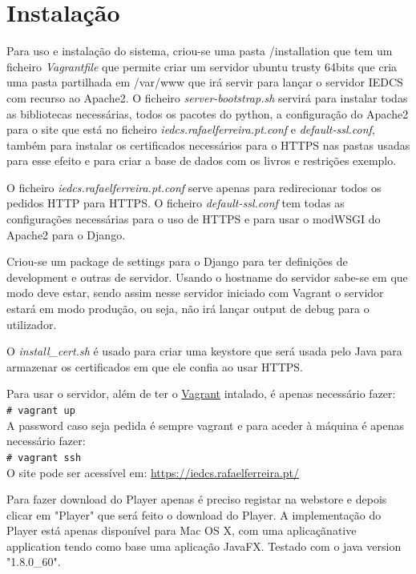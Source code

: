 \documentclass[pdftex,12pt,a4paper]{report}
\newcommand{\shellcmd}[1]{\\\indent\indent\texttt{\footnotesize\# #1}\\}
\begin{document}
\section{Instalação}

Para uso e instalação do sistema, criou-se uma pasta /installation que tem um ficheiro \textit{Vagrantfile} que permite criar um servidor ubuntu trusty 64bits que cria uma pasta partilhada em /var/www que irá servir para lançar o servidor IEDCS com recurso ao Apache2. O ficheiro \textit{server-bootstrap.sh} servirá para instalar todas as bibliotecas necessárias, todos os pacotes do python, a configuração do Apache2 para o site que está no ficheiro \textit{iedcs.rafaelferreira.pt.conf} e \textit{default-ssl.conf}, também para instalar os certificados necessários para o HTTPS nas pastas usadas para esse efeito e para criar a base de dados com os livros e restrições exemplo.
	
O ficheiro \textit{iedcs.rafaelferreira.pt.conf} serve apenas para redirecionar todos os pedidos HTTP para HTTPS. O ficheiro \textit{default-ssl.conf} tem todas as configurações necessárias para o uso de HTTPS e para usar o modWSGI do Apache2 para o Django.

Criou-se um package de settings para o Django para ter definições de development e outras de servidor. Usando o hostname do servidor sabe-se em que modo deve estar, sendo assim nesse servidor iniciado com Vagrant o servidor estará em modo produção, ou seja, não irá lançar output de debug para o utilizador.

O \textit{install{\_}cert.sh} é usado para criar uma keystore que será usada pelo Java para armazenar os certificados em que ele confia ao usar HTTPS.	
	
Para usar o servidor, além de ter o \href{https://www.vagrantup.com/downloads.html}{Vagrant} intalado, é apenas necessário fazer:
\shellcmd{vagrant up}

A password caso seja pedida é sempre vagrant e para aceder à máquina é apenas necessário fazer: \shellcmd{vagrant ssh}

O site pode ser acessível em: \url{https://iedcs.rafaelferreira.pt/}

Para fazer download do Player apenas é preciso registar na webstore e depois clicar em "Player" que será feito o download do Player. A implementação do Player está apenas disponível para Mac OS X, com uma aplicaçãnative application  tendo como base uma aplicação JavaFX. Testado com o java version "1.8.0{\_}60".
\end{document}
